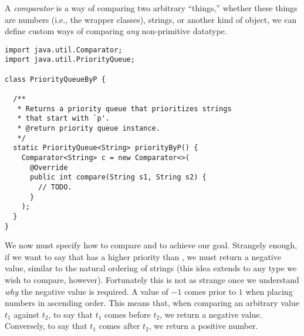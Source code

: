 A \emph{comparator} is a way of comparing two arbitrary ``things,'' whether these things are numbers (i.e., the wrapper classes), strings, or another kind of object, we can define custom ways of comparing \emph{any} non-primitive datatype.


\begin{lstlisting}[language=MyJava]
import java.util.Comparator;
import java.util.PriorityQueue;

class PriorityQueueByP {

  /**
   * Returns a priority queue that prioritizes strings 
   * that start with `p'.
   * @return priority queue instance.
   */
  static PriorityQueue<String> priorityByP() {
    Comparator<String> c = new Comparator<>(
      @Override
      public int compare(String s1, String s2) { 
        // TODO.
      }
    );
  }
}
\end{lstlisting}

We now must specify how to compare  and  to achieve our goal. Strangely enough, if we want to say that  has a higher priority than , we must return a negative value, similar to the natural ordering of strings (this idea extends to any type we wish to compare, however). Fortunately this is not as strange once we understand \emph{why} the negative value is required. A value of $-1$ comes prior to $1$ when placing numbers in ascending order. This means that, when comparing an arbitrary value $t_1$ against $t_2$, to say that $t_1$ comes before $t_2$, we return a negative value. Conversely, to say that $t_1$ comes after $t_2$, we return a positive number.  

